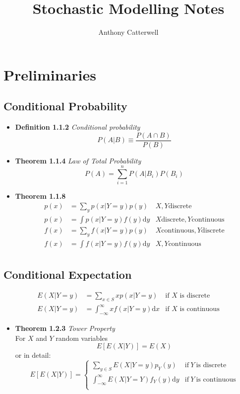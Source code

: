 \documentclass[11pt,a4paper]{article}
\title{Stochastic Modelling Notes}
\author{Anthony Catterwell}
\begin{document}
\maketitle
\tableofcontents

\break

\section{Preliminaries}
\subsection{Conditional Probability}
\begin{itemize}
    \item \textbf{Definition 1.1.2} \emph{Conditional probability}
        $$P(A|B) \equiv \frac{P(A \cap B)}{P(B)}$$
    \item \textbf{Theorem 1.1.4} \emph{Law of Total Probability}
        $$P(A) = \sum_{i=1}^n P(A|B_i)P(B_i)$$
    \item \textbf{Theorem 1.1.8}
        \begin{align*}{}
            p(x) &= \sum_y p(x|Y=y)p(y)            & X, Y \text{discrete} \\
            p(x) &= \int   p(x|Y=y)f(y)\mathrm{d}y & X \text{discrete}, Y \text{continuous} \\
            f(x) &= \sum_y f(x|Y=y)p(y)            & X\text{continuous}, Y \text{discrete} \\
            f(x) &= \int   f(x|Y=y)f(y)\mathrm{d}y & X, Y \text{continuous} \\
        \end{align*}
\end{itemize}

\subsection{Conditional Expectation}
\begin{align*}{}
    E(X|Y = y) &= \sum_{x \in S} xp(x|Y=y) &\text{if $X$ is discrete} \\
    E(X|Y = y) &= \int_{-\infty}^{\infty} xf(x|Y=y)\mathrm{d}x &\text{if $X$ is continuous}
\end{align*}

\begin{itemize}
	\item \textbf{Theorem 1.2.3} \emph{Tower Property}\\
		For $X$ and $Y$ random variables
		$$E[E(X|Y)] = E(X)$$
		or in detail:
		\[
			E[E(X|Y)] = 
			\begin{cases}{}
				\sum_{y \in S} E(X|Y = y) p_Y(y) & \text{if} \ Y \ \text{is discrete} \\
				\int_{-\infty}^\infty E(X|Y = Y)f_Y(y) \mathrm{d}y & \text{if} \ Y \ \text{is continuous} \\
			\end{cases}
		\]
\end{itemize}
\end{document}
